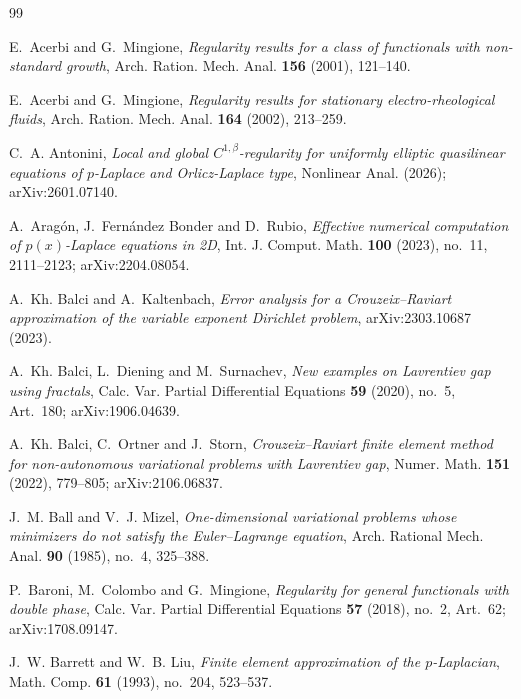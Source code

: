 \documentclass[11pt]{amsart}
\theoremstyle{definition}
\theoremstyle{remark}
\numberwithin{equation}{section}
\begin{document}
\begin{thebibliography}{99}

E.~Acerbi and G.~Mingione, \emph{Regularity results for a class of functionals with non-standard growth}, Arch. Ration. Mech. Anal. \textbf{156} (2001), 121--140.

E.~Acerbi and G.~Mingione, \emph{Regularity results for stationary electro-rheological fluids}, Arch. Ration. Mech. Anal. \textbf{164} (2002), 213--259.

C.~A. Antonini, \emph{Local and global $C^{1,\beta}$-regularity for uniformly elliptic quasilinear equations of $p$-Laplace and Orlicz-Laplace type}, Nonlinear Anal. (2026); arXiv:2601.07140.

A.~Arag\'on, J.~Fern\'andez Bonder and D.~Rubio, \emph{Effective numerical computation of $p(x)$-Laplace equations in 2D}, Int. J. Comput. Math. \textbf{100} (2023), no.~11, 2111--2123; arXiv:2204.08054.

A.~Kh. Balci and A.~Kaltenbach, \emph{Error analysis for a Crouzeix--Raviart approximation of the variable exponent Dirichlet problem}, arXiv:2303.10687 (2023).

A.~Kh. Balci, L.~Diening and M.~Surnachev, \emph{New examples on Lavrentiev gap using fractals}, Calc. Var. Partial Differential Equations \textbf{59} (2020), no.~5, Art.~180; arXiv:1906.04639.

A.~Kh. Balci, C.~Ortner and J.~Storn, \emph{Crouzeix--Raviart finite element method for non-autonomous variational problems with Lavrentiev gap}, Numer. Math. \textbf{151} (2022), 779--805; arXiv:2106.06837.

J.~M. Ball and V.~J. Mizel, \emph{One-dimensional variational problems whose minimizers do not satisfy the Euler--Lagrange equation}, Arch. Rational Mech. Anal. \textbf{90} (1985), no.~4, 325--388.

P.~Baroni, M.~Colombo and G.~Mingione, \emph{Regularity for general functionals with double phase}, Calc. Var. Partial Differential Equations \textbf{57} (2018), no.~2, Art.~62; arXiv:1708.09147.

J.~W. Barrett and W.~B. Liu, \emph{Finite element approximation of the $p$-Laplacian}, Math. Comp. \textbf{61} (1993), no.~204, 523--537.


\end{thebibliography}
\end{document}
